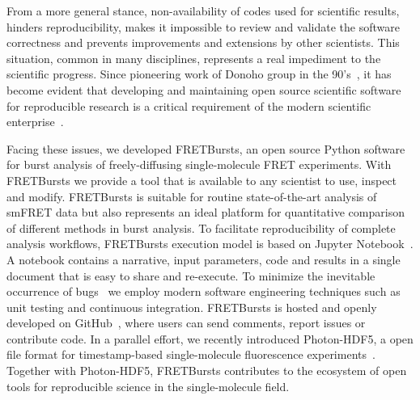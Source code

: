 From a more general stance, non-availability of codes
used for scientific results, hinders reproducibility,
makes it impossible to review and validate the software correctness
and prevents improvements and extensions by other scientists.
This situation, common in many disciplines,
represents a real impediment to the scientific progress.
Since pioneering work of Donoho group in the 90's~\cite{Buckheit_1995},
it has become evident that developing and maintaining open source scientific software
for reproducible research is a critical requirement of the modern
scientific enterprise~\cite{Ince_2012,Vihinen_2015}.


Facing these issues, we developed FRETBursts,
an open source Python software for burst analysis of freely-diffusing
single-molecule FRET experiments.
With FRETBursts we provide a tool that is available to any scientist
to use, inspect and modify. FRETBursts is suitable for routine state-of-the-art
analysis of smFRET data but also represents an ideal platform
for quantitative comparison of different methods in burst analysis.
To facilitate reproducibility of complete analysis
workflows, FRETBursts execution model is based on Jupyter Notebook~\cite{Shen_2014}.
A notebook contains a narrative, input parameters, code and 
results in a single document that is easy to share and re-execute.
To minimize the inevitable occurrence of bugs~\cite{Soergel_2015} 
we employ modern software engineering techniques
such as unit testing and continuous integration.
FRETBursts is hosted and openly developed on GitHub~\cite{Blischak_2016,Prli__2012},
where users can send comments, report issues or contribute code.
In a parallel effort, we recently introduced Photon-HDF5,
a open file format for timestamp-based single-molecule fluorescence
experiments~\cite{Ingargiola2016}. Together with Photon-HDF5,
FRETBursts contributes to the ecosystem
of open tools for reproducible science in the single-molecule field.

